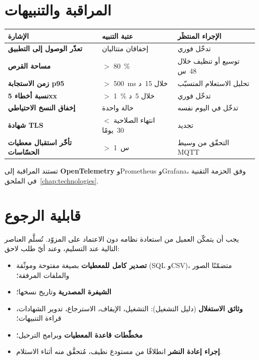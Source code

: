 \section{المراقبة والتنبيهات}
\begin{xltabular}{\textwidth}{>{\bfseries}p{4.2cm} p{3.4cm} X}
\toprule
\textbf{الإشارة} & \textbf{عتبة التنبيه} & \textbf{الإجراء المنتظَر} \\
\midrule
\endhead
تعذّر الوصول إلى التطبيق & إخفاقان متتاليان & تدخّل فوري \\
مساحة القرص & $>$ 80~\% & توسيع أو تنظيف خلال 48~س \\
زمن الاستجابة p95 & $>$ 500~ms خلال 15~د & تحليل الاستعلام المتسبّب \\
نسبة أخطاء 5xx & $>$ 1~\% خلال 5~د & تدخّل فوري \\
إخفاق النسخ الاحتياطي & حالة واحدة & تدخّل في اليوم نفسه \\
شهادة TLS & انتهاء الصلاحية $<$ 30~يومًا & تجديد \\
تأخّر استقبال معطيات الحسّاسات & $>$ 1~س & التحقّق من وسيط MQTT \\
\bottomrule
\end{xltabular}

تستند المراقبة إلى \textbf{OpenTelemetry} وPrometheus وGrafana، وفق الحزمة
التقنية في الملحق~\ref{chap:technologies}.

\section{قابلية الرجوع}
يجب أن يتمكّن العميل من استعادة نظامه دون الاعتماد على المزوّد. تُسلَّم العناصر
التالية عند التسليم، وعند أيّ طلب لاحق:

\begin{itemize}
  \item \textbf{تصدير كامل للمعطيات} بصيغة مفتوحة وموثّقة (SQL وCSV)، متضمّنًا
        الصور والملفات المرفقة؛
  \item \textbf{الشيفرة المصدرية} وتاريخ نسخها؛
  \item \textbf{وثائق الاستغلال} (دليل التشغيل): التشغيل، الإيقاف، الاسترجاع،
        تدوير الشهادات، قراءة التنبيهات؛
  \item \textbf{مخطّطات قاعدة المعطيات} وبرامج الترحيل؛
  \item \textbf{إجراء إعادة النشر} انطلاقًا من مستودع نظيف، مُتحقَّق منه أثناء
        الاستلام.
\end{itemize}

